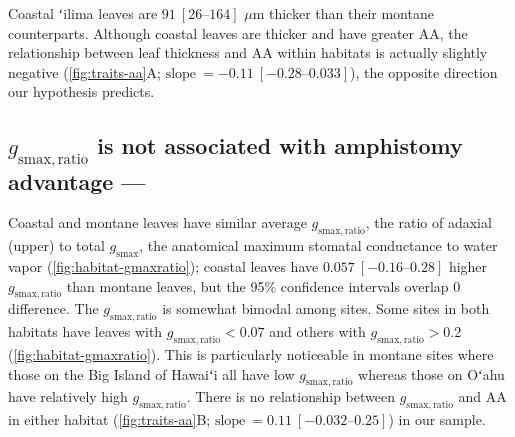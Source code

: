 \documentclass[
  letterpaper,
  DIV=11,
  numbers=noendperiod]{scrartcl}
\begin{document}
Coastal ʻilima leaves are \(91~[\numrange{26}{164}]\) \(\mu\text{m}\)
thicker than their montane counterparts. Although coastal leaves are
thicker and have greater \(\mathrm{AA}\), the relationship between leaf
thickness and \(\mathrm{AA}\) within habitats is actually slightly
negative (\autoref{fig:traits-aa}A;
\(\text{slope}~= -0.11~[\numrange{-0.28}{0.033}]\)), the opposite
direction our hypothesis predicts.

\hypertarget{g_mathrmsmaxratio-is-not-associated-with-amphistomy-advantage}{%
\subsection{\texorpdfstring{\(g_\mathrm{smax,ratio}\) is not associated
with amphistomy advantage
---}{g\_\textbackslash mathrm\{smax,ratio\} is not associated with amphistomy advantage ---}}\label{g_mathrmsmaxratio-is-not-associated-with-amphistomy-advantage}}

Coastal and montane leaves have similar average
\(g_\mathrm{smax,ratio}\), the ratio of adaxial (upper) to total
\(g_\mathrm{smax}\), the anatomical maximum stomatal conductance to
water vapor (\autoref{fig:habitat-gmaxratio}); coastal leaves have
\(0.057~[\numrange{-0.16}{0.28}]\) higher \(g_\mathrm{smax,ratio}\) than
montane leaves, but the 95\% confidence intervals overlap 0 difference.
The \(g_\mathrm{smax,ratio}\) is somewhat bimodal among sites. Some
sites in both habitats have leaves with \(g_\mathrm{smax,ratio} < 0.07\)
and others with \(g_\mathrm{smax,ratio} > 0.2\)
(\autoref{fig:habitat-gmaxratio}). This is particularly noticeable in
montane sites where those on the Big Island of Hawaiʻi all have low
\(g_\mathrm{smax,ratio}\) whereas those on Oʻahu have relatively high
\(g_\mathrm{smax,ratio}\). There is no relationship between
\(g_\mathrm{smax,ratio}\) and \(\mathrm{AA}\) in either habitat
(\autoref{fig:traits-aa}B;
\(\text{slope}~= 0.11~[\numrange{-0.032}{0.25}]\)) in our sample.
\end{document}
